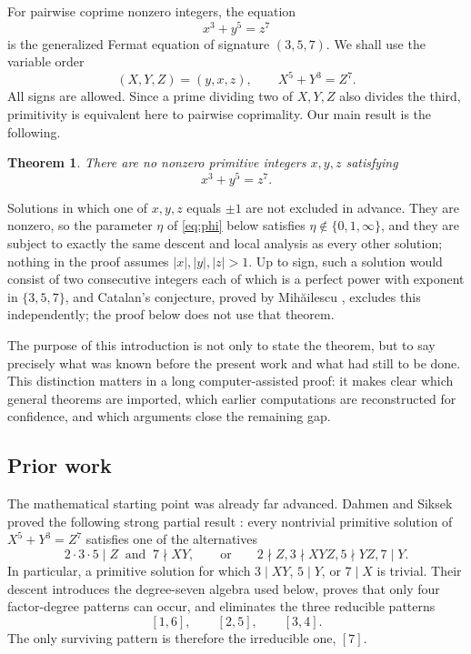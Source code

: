 \documentclass[11pt]{article}
\newtheorem{theorem}{Theorem}[section]
\theoremstyle{definition}
\theoremstyle{remark}
\begin{document}
For pairwise coprime nonzero integers, the equation
\begin{equation}\label{eq:original}
                         x^3+y^5=z^7
\end{equation}
is the generalized Fermat equation of signature $(3,5,7)$.  We shall use
the variable order
\begin{equation}\label{eq:DS-order}
                    (X,Y,Z)=(y,x,z),\qquad X^5+Y^3=Z^7.
\end{equation}
All signs are allowed.  Since a prime dividing two of $X,Y,Z$ also divides
the third, primitivity is equivalent here to pairwise coprimality.  Our main
result is the following.

\begin{theorem}\label{thm:main}
There are no nonzero primitive integers $x,y,z$ satisfying
\[
                             x^3+y^5=z^7.
\]
\end{theorem}

Solutions in which one of $x,y,z$ equals $\pm1$ are not excluded in
advance.  They are nonzero, so the parameter $\eta$ of \eqref{eq:phi}
below satisfies $\eta\notin\{0,1,\infty\}$, and they are subject to
exactly the same descent and local analysis as every other solution;
nothing in the proof assumes $|x|,|y|,|z|>1$.  Up to sign, such a
solution would consist of two consecutive integers each of which is a
perfect power with exponent in $\{3,5,7\}$, and Catalan's conjecture,
proved by Mih\u{a}ilescu \cite{Mihailescu}, excludes this independently;
the proof below does not use that theorem.

The purpose of this introduction is not only to state the theorem, but to
say precisely what was known before the present work and what had still to
be done.  This distinction matters in a long computer-assisted proof: it
makes clear which general theorems are imported, which earlier computations
are reconstructed for confidence, and which arguments close the remaining
gap.

\subsection{Prior work}

The mathematical starting point was already far advanced.  Dahmen and
Siksek proved the following strong partial result
\cite[Theorem~1]{DahmenSiksek}: every nontrivial primitive solution of
$X^5+Y^3=Z^7$ satisfies one of the alternatives
\begin{equation}\label{eq:DS-theorem-one}
 2\cdot3\cdot5\mid Z\ \text{ and }\ 7\nmid XY,
 \qquad\text{or}\qquad
 2\nmid Z, 3\nmid XYZ, 5\nmid YZ, 7\mid Y.
\end{equation}
In particular, a primitive solution for which $3\mid XY$, $5\mid Y$, or
$7\mid X$ is trivial.  Their descent introduces the degree-seven algebra
used below, proves that only four factor-degree patterns can occur, and
eliminates the three reducible patterns
\[
                         [1,6],\qquad[2,5],\qquad[3,4].
\]
The only surviving pattern is therefore the irreducible one, $[7]$.
\end{document}
